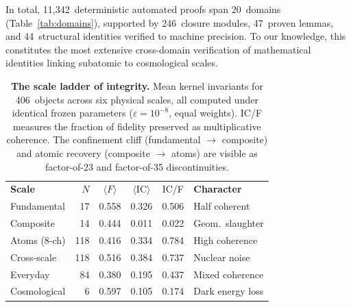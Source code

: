 \documentclass[
  aps,
  prx,
  twocolumn,
  superscriptaddress,
  nofootinbib,
  floatfix
]{revtex4-2}
\newcommand{\eps}{\varepsilon}
\newcommand{\IC}{\mathrm{IC}}
\begin{document}
In total, 11{,}342~deterministic automated proofs span
20~domains (Table~\ref{tab:domains}), supported by
246~closure modules, 47~proven lemmas, and 44~structural
identities verified to machine precision. To our knowledge,
this constitutes the most extensive cross-domain verification
of mathematical identities linking subatomic to cosmological
scales.

\begin{table}[!htbp]
\caption{\textbf{The scale ladder of integrity.} Mean kernel
invariants for 406~objects across six physical scales, all computed
under identical frozen parameters
($\eps = 10^{-8}$, equal weights). IC/F measures the fraction of
fidelity preserved as multiplicative coherence. The confinement cliff
(fundamental $\to$ composite) and atomic recovery (composite $\to$
atoms) are visible as factor-of-23 and factor-of-35 discontinuities.}
\label{tab:scales}
\begin{ruledtabular}
\begin{tabular}{lrcccl}
\textbf{Scale} & $N$ & $\langle F\rangle$ & $\langle\IC\rangle$
  & IC/F & \textbf{Character} \\
\colrule
Fundamental   &  17 & 0.558 & 0.326 & 0.506 & Half coherent \\
Composite     &  14 & 0.444 & 0.011 & 0.022 & \textcolor{CliffRed}{Geom.\ slaughter} \\
Atoms (8-ch)  & 118 & 0.416 & 0.334 & 0.784 & \textcolor{HealGreen}{High coherence} \\
Cross-scale   & 118 & 0.516 & 0.384 & 0.737 & Nuclear noise \\
Everyday      &  84 & 0.380 & 0.195 & 0.437 & Mixed coherence \\
Cosmological  &   6 & 0.597 & 0.105 & 0.174 & Dark energy loss \\
\end{tabular}
\end{ruledtabular}
\end{table}
\end{document}
